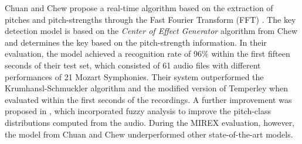 

Chuan and Chew propose a real-time algorithm based on the
extraction of pitches and pitch-strengths through the Fast
Fourier Transform (FFT) \parencite{chuan2005polyphonic}. The
key detection model is based on the \emph{Center of Effect
Generator} algorithm from Chew \parencite{chew2002spiral}
and determines the key based on the pitch-strength
information. In their evaluation, the model achieved a
recognition rate of 96\% within the first fifteen seconds of
their test set, which consisted of 61 audio files with
different performances of 21 Mozart Symphonies. Their system
outperformed the Krumhansl-Schmuckler algorithm and the
modified version of Temperley when evaluated within the
first seconds of the recordings. A further improvement was
proposed in \parencite{chuan2005fuzzy}, which incorporated
fuzzy analysis to improve the pitch-class distributions
computed from the audio. During the MIREX evaluation,
however, the model from Chuan and Chew underperformed other
state-of-the-art models.


